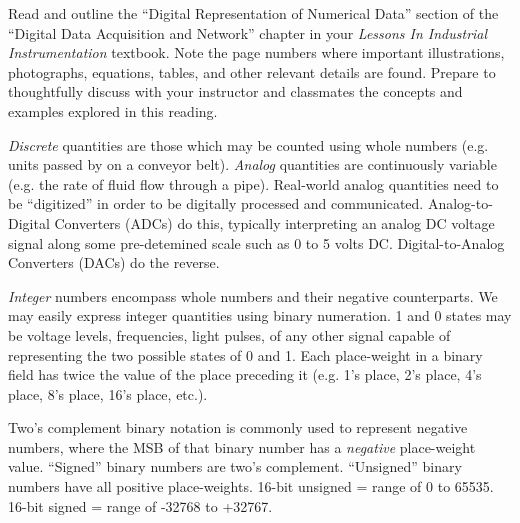 

Read and outline the ``Digital Representation of Numerical Data'' section of the ``Digital Data Acquisition and Network'' chapter in your {\it Lessons In Industrial Instrumentation} textbook.  Note the page numbers where important illustrations, photographs, equations, tables, and other relevant details are found.  Prepare to thoughtfully discuss with your instructor and classmates the concepts and examples explored in this reading.














{\it Discrete} quantities are those which may be counted using whole numbers (e.g. units passed by on a conveyor belt).  {\it Analog} quantities are continuously variable (e.g. the rate of fluid flow through a pipe).  Real-world analog quantities need to be ``digitized'' in order to be digitally processed and communicated.  Analog-to-Digital Converters (ADCs) do this, typically interpreting an analog DC voltage signal along some pre-detemined scale such as 0 to 5 volts DC.  Digital-to-Analog Converters (DACs) do the reverse.

\vskip 10pt

{\it Integer} numbers encompass whole numbers and their negative counterparts.  We may easily express integer quantities using binary numeration.  1 and 0 states may be voltage levels, frequencies, light pulses, of any other signal capable of representing the two possible states of 0 and 1.  Each place-weight in a binary field has twice the value of the place preceding it (e.g. 1's place, 2's place, 4's place, 8's place, 16's place, etc.).

\vskip 10pt

Two's complement binary notation is commonly used to represent negative numbers, where the MSB of that binary number has a {\it negative} place-weight value.  ``Signed'' binary numbers are two's complement.  ``Unsigned'' binary numbers have all positive place-weights.  16-bit unsigned = range of 0 to 65535.  16-bit signed = range of -32768 to +32767.

